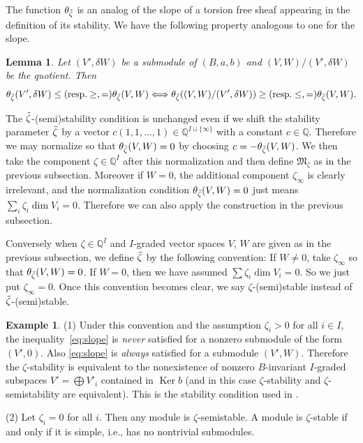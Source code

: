 \documentclass[11pt]{article}
\newtheorem{Lemma}[equation]{Lemma}
\theoremstyle{definition}
\newtheorem{Example}[equation]{Example}
\numberwithin{equation}{section}
\newcommand{\Q}{{\mathbb Q}}
\newcommand{\Ker}{\operatorname{Ker}}
\newcommand{\M}{{\mathfrak M}} %
\begin{document}
The function $\theta_{\Tilde\zeta}$ is an analog of the slope of a
torsion free sheaf appearing in the def\/inition of its stability. We
have the following property analogous to one for the slope.
\begin{Lemma}\label{lem:slope}
  Let $(V',\delta W)$ be a submodule of $(B,a,b)$ and
  $(V,W)/(V',\delta W)$ be the quotient. Then
  \begin{equation*}
     \theta_{\Tilde\zeta}(V',\delta W)
     \le (\text{resp.} \ge, =)
     \theta_{\Tilde\zeta}(V,W)
     \Longleftrightarrow
     \theta_{\Tilde\zeta}((V,W)/(V',\delta W))
     \ge (\text{resp.} \le, =)
     \theta_{\Tilde\zeta}(V,W).
  \end{equation*}
\end{Lemma}


The $\Tilde\zeta$-(semi)stability condition is unchanged even if we
shift the stability parameter $\Tilde\zeta$ by a vector
$c(1,1,\dots,1)\in \Q^{I\sqcup\{\infty\}}$ with a constant $c\in \Q$.
Therefore we may normalize so that $\theta_{\Tilde\zeta}(V,W) = 0$
by choosing $c = -\theta_{\Tilde\zeta}(V,W)$.
We then take the component $\zeta\in\Q^I$ after this normalization and
then def\/ine $\M_\zeta$ as in the previous subsection.
Moreover if $W=0$, the additional component $\zeta_\infty$ is clearly
irrelevant, and the normalization condition
$\theta_{\Tilde\zeta}(V,W) = 0$ just means $\sum_i \zeta_i \dim V_i
= 0$. Therefore we can also apply the construction in the previous
subsection.

Conversely when $\zeta\in\Q^I$ and $I$-graded vector spaces $V$, $W$
are given as in the previous subsection, we def\/ine $\Tilde\zeta$ by
the following convention: If $W \neq 0$, take $\zeta_\infty$ so that
$\theta_{\Tilde\zeta}(V,W) = 0$. If $W = 0$, then we have assumed
$\sum \zeta_i \dim V_i = 0$. So we just put $\zeta_\infty = 0$.
%
Once this convention becomes clear, we say
$\zeta$-(semi)stable instead of $\Tilde\zeta$-(semi)stable.

\begin{Example}\label{ex:stndcham}
(1)
Under this convention and the assumption $\zeta_{i} > 0$ for all $i\in I$,
the inequali\-ty~\eqref{eq:slope} is {\it never\/} satisf\/ied for a
nonzero submodule of the form $(V',0)$. Also
\eqref{eq:slope} is {\it always} satisf\/ied for a submodule
$(V',W)$.
Therefore the $\zeta$-stability is equivalent to the nonexistence of
nonzero $B$-invariant $I$-graded subspaces $V' = \bigoplus V'_i$
contained in $\Ker b$
(and in this case $\zeta$-stability and $\zeta$-semistability
are equivalent). This is the stability condition used in
\cite[{3.9}]{Na-alg}.

(2) Let $\zeta_i = 0$ for all $i$. Then any module is
$\zeta$-semistable. A module is $\zeta$-stable if and only if it is
simple, i.e., has no nontrivial submodules.
\end{Example}
\end{document}
